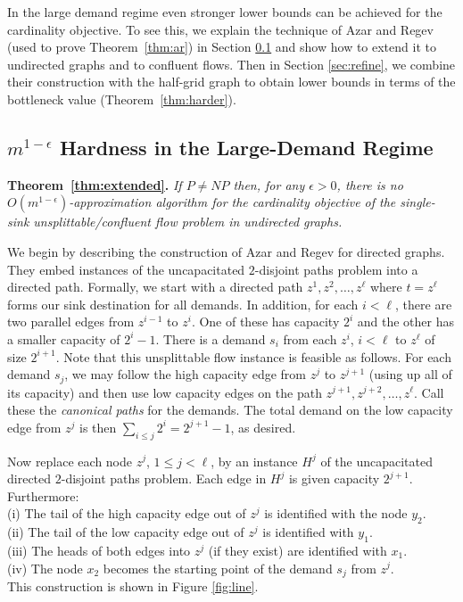 \documentclass[12pt]{article}
\begin{document}
In the large demand regime even stronger lower bounds can be achieved for the cardinality objective.
To see this, we explain the technique of Azar and Regev \cite{azar2001strongly} (used to prove Theorem~\ref{thm:ar})
in Section \ref{sec:expo-demands} and show how to extend it to undirected graphs and to confluent flows.
Then in Section \ref{sec:refine}, we combine their construction with the half-grid graph
to obtain lower bounds in terms of the bottleneck value (Theorem~\ref{thm:harder}).

\subsection{$m^{1-\epsilon}$ Hardness in the Large-Demand Regime}\label{sec:expo-demands}



{{\noindent\bf Theorem~\ref{thm:extended}.} \itshape
If $P \neq NP$ then, for any $\epsilon > 0$, there is no $O(m^{1-\epsilon})$-approximation algorithm
for the cardinality objective of the single-sink unsplittable/confluent flow problem in undirected graphs.\\
}

We begin by describing the construction of Azar and Regev for directed graphs.
They embed instances of the uncapacitated $2$-disjoint paths problem into a directed path.
Formally, we start with a directed path  $z^1,z^2, \ldots ,z^{\ell}$ where
 $t=z^{\ell}$  forms our sink destination for all demands. In addition, for each $i < \ell$, there are two parallel edges
 from $z^{i-1}$ to $z^{i}$. One of these has capacity $2^{i}$ and the other has a smaller capacity of $2^{i}-1$.
 There is a demand $s_i$ from each $z^i$, $i < \ell$ to $z^{\ell}$ of size $2^{i+1}$.
 Note that this unsplittable flow instance is feasible as follows. For each demand $s_j$, we may follow the high capacity edge
 from $z^j$ to $z^{j+1}$ (using up all of its capacity) and then use low capacity edges on the
 path $z^{j+1},z^{j+2}, \ldots ,z^{\ell}$. Call these the {\em canonical paths} for the demands.
The total demand on the low capacity edge from $z^j$ is then $\sum_{i \leq j} 2^i =2^{j+1}-1$, as desired.

Now replace each node $z^j$, $1\le j < \ell$, by an instance $H^j$ of the uncapacitated directed $2$-disjoint paths problem.
 Each edge in $H^j$ is given capacity $2^{j+1}$. Furthermore:\\
 (i) The tail of the high capacity edge out of $z^j$ is identified with the node $y_2$. \\
 (ii)  The tail of the low capacity edge out of $z^j$ is identified with $y_1$.\\
 (iii) The heads of both edges into $z^j$ (if they exist) are identified with $x_1$.\\
 (iv) The node $x_2$ becomes the starting point of the demand $s_j$ from $z^j$. \\
This construction is shown in Figure \ref{fig:line}.
\end{document}
